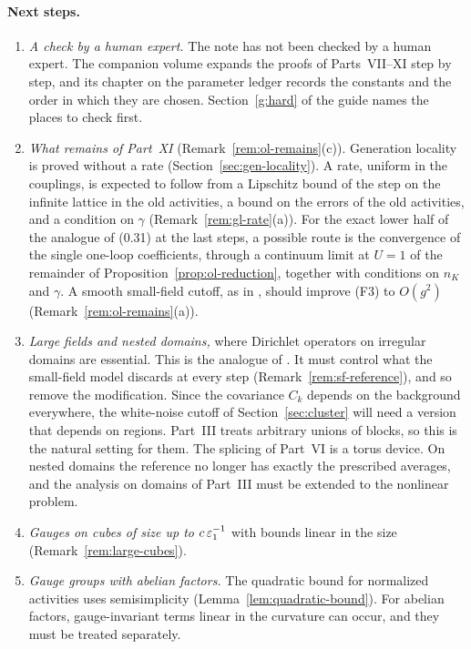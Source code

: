 \paragraph{Next steps.}
\begin{enumerate}[label=(\arabic*)]
\item \emph{A check by a human expert.} The note has not been checked by a human expert. The companion volume expands the proofs of Parts~VII--XI step by step, and its chapter on the parameter ledger records the constants and the order in which they are chosen. Section~\ref{g:hard} of the guide names the places to check first.
\item \emph{What remains of Part~XI} (Remark~\ref{rem:ol-remains}(c)). Generation locality is proved without a rate (Section~\ref{sec:gen-locality}). A rate, uniform in the couplings, is expected to follow from a Lipschitz bound of the step on the infinite lattice in the old activities, a bound on the errors of the old activities, and a condition on $\gamma$ (Remark~\ref{rem:gl-rate}(a)). For the exact lower half of the analogue of (0.31) at the last steps, a possible route is the convergence of the single one-loop coefficients, through a continuum limit at $U=1$ of the remainder of Proposition~\ref{prop:ol-reduction}, together with conditions on $n_K$ and $\gamma$. A smooth small-field cutoff, as in \cite[(2.9)]{BalYM4I}, should improve (F3) to $O(g^2)$ (Remark~\ref{rem:ol-remains}(a)).
\item \emph{Large fields and nested domains,} where Dirichlet operators on irregular domains are essential. This is the analogue of \cite{DimockII,DimockIII}. It must control what the small-field model discards at every step (Remark~\ref{rem:sf-reference}), and so remove the modification. Since the covariance $C_k$ depends on the background everywhere, the white-noise cutoff of Section~\ref{sec:cluster} will need a version that depends on regions. Part~III treats arbitrary unions of blocks, so this is the natural setting for them. The splicing of Part~VI is a torus device. On nested domains the reference no longer has exactly the prescribed averages, and the analysis on domains of Part~III must be extended to the nonlinear problem.
\item \emph{Gauges on cubes of size up to $c\,\varepsilon_1^{-1}$} with bounds linear in the size (Remark~\ref{rem:large-cubes}).
\item \emph{Gauge groups with abelian factors.} The quadratic bound for normalized activities uses semisimplicity (Lemma~\ref{lem:quadratic-bound}). For abelian factors, gauge-invariant terms linear in the curvature can occur, and they must be treated separately.
\end{enumerate}
